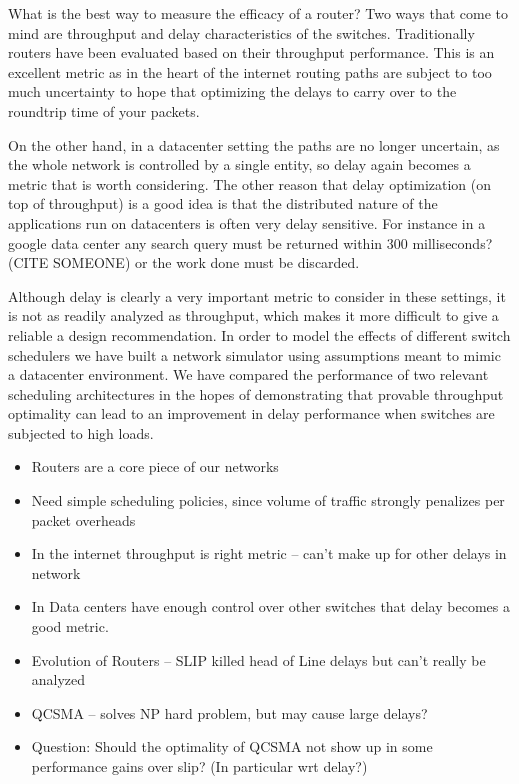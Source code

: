 \documentclass{IEEEtran}%
\begin{document}
What is the best way to measure the efficacy of a router?  Two ways that come to mind are throughput and delay characteristics of the switches.  Traditionally routers have been evaluated based on their throughput performance.  This is an excellent metric as in the heart of the internet routing paths are subject to too much uncertainty to hope that optimizing the delays to carry over to the roundtrip time of your packets.

On the other hand, in a datacenter setting the paths are no longer uncertain, as the whole network is controlled by a single entity, so delay again becomes a metric that is worth considering.  The other reason that delay optimization (on top of throughput) is a good idea is that the distributed nature of the applications run on datacenters is often very delay sensitive.  For instance in a google data center any search query must be returned within 300 milliseconds? (CITE SOMEONE) or the work done must be discarded.

Although delay is clearly a very important metric to consider in these settings, it is not as readily analyzed as throughput, which makes it more difficult to give a reliable a design recommendation.  In order to model the effects of different switch schedulers we have built a network simulator using assumptions meant to mimic a datacenter environment.  We have compared the performance of two relevant scheduling architectures in the hopes of demonstrating that provable throughput optimality can lead to an improvement in delay performance when switches are subjected to high loads.

\begin{itemize}
\item Routers are a core piece of our networks
\item Need simple scheduling policies, since volume of traffic strongly penalizes per packet overheads 
\item In the internet throughput is right metric -- can't make up for other delays in network
\item In Data centers have enough control over other switches that delay becomes a good metric.
\item Evolution of Routers -- SLIP killed head of Line delays but can't really be analyzed
\item QCSMA -- solves NP hard problem, but may cause large delays?
\item Question:  Should the optimality of QCSMA not show up in some performance gains over slip?  (In particular wrt delay?)
\end{itemize}
\end{document}
